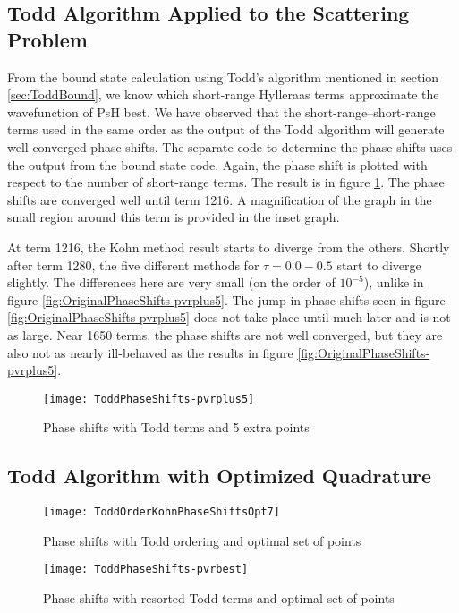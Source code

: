\documentclass[Dissertation.tex]{subfiles}
\begin{document}
\subsection{Todd Algorithm Applied to the Scattering Problem}
\label{sec:ToddScattering}
From the bound state calculation using Todd's algorithm mentioned in section \ref{sec:ToddBound}, we know which short-range Hylleraas terms approximate the wavefunction of PsH best. We have observed that the short-range--short-range terms used in the same order as the output of the Todd algorithm will generate well-converged phase shifts. The separate code to determine the phase shifts uses the output from the bound state code. Again, the phase shift is plotted with respect to the number of short-range terms. The result is in figure \ref{fig:ToddPhaseShifts-pvrplus5}. The phase shifts are converged well until term 1216. A magnification of the graph in the small region around this term is provided in the inset graph.

At term 1216, the Kohn method result starts to diverge from the others. Shortly after term 1280, the five different methods for $\tau = 0.0 - 0.5$ start to diverge slightly. The differences here are very small (on the order of $10^{-5}$), unlike in figure \ref{fig:OriginalPhaseShifts-pvrplus5}. The jump in phase shifts seen in figure \ref{fig:OriginalPhaseShifts-pvrplus5} does not take place until much later and is not as large. Near 1650 terms, the phase shifts are not well converged, but they are also not as nearly ill-behaved as the results in figure \ref{fig:OriginalPhaseShifts-pvrplus5}.

\begin{figure}[H]
	\centering
	\texttt{[image: ToddPhaseShifts-pvrplus5]}
	\caption{Phase shifts with Todd terms and 5 extra points}
	\label{fig:ToddPhaseShifts-pvrplus5}
\end{figure}


\subsection{Todd Algorithm with Optimized Quadrature}


\begin{figure}[H]
	\centering
	\texttt{[image: ToddOrderKohnPhaseShiftsOpt7]}
	\caption{Phase shifts with Todd ordering and optimal set of points}
	\label{fig:ToddOrderKohnPhaseShiftsOpt7}
\end{figure}


\begin{figure}[H]
	\centering
	\texttt{[image: ToddPhaseShifts-pvrbest]}
	\caption{Phase shifts with resorted Todd terms and optimal set of points}
	\label{fig:ToddPhaseShifts-pvroptimized}
\end{figure}
\end{document}
